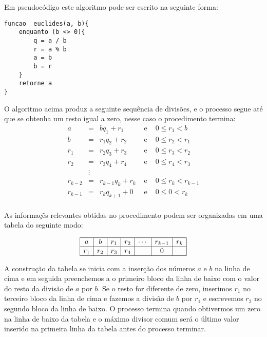 Em pseudoc\'odigo este algoritmo pode ser escrito na seguinte forma:

\begin{verbatim}
funcao  euclides(a, b){
    enquanto (b <> 0){
        q = a / b 
        r = a % b
        a = b 
        b = r
    }
    retorne a
}
\end{verbatim} 

O algoritmo acima produz a seguinte sequ\^{e}ncia de divis\~{o}es, e o processo segue at\'{e}
que se obtenha um resto igual a zero, nesse caso o procedimento termina:
\[
\begin{array}{rclcl}
a   		& =      & bq_{1}+r_{1} 			    & \textrm{ e } & 0\leq r_{1}<b       \\
b   		& =      & r_{1}q_{2}+r_{2} 	    & \textrm{ e } & 0\leq r_{2}<r_{1}       \\
r_{1}		& =      & r_{2}q_{3}+r_{3} 	    & \textrm{ e } & 0\leq r_{3}<r_{2}       \\
r_{2}   & =      & r_{3}q_{4}+r_{4} 	    & \textrm{ e } & 0\leq r_{4}<r_{3}       \\
        & \vdots &     		          	    &              &                     \\
r_{k-2} & =      & r_{k-1}q_{k}+r_{k}     & \textrm{ e } & 0\leq r_{k}<r_{k-1} \\				
r_{k-1} & =      & r_{k}q_{k+1}+ 0        & \textrm{ e } & 0\leq 0    <r_{k} \\		
\end{array}
\]  

As informa\c{c}\~{e}s relevantes obtidas no procedimento podem ser organizadas em uma tabela do seguinte modo:

\[
\begin{array}{|c|c|c|c|c|c|c|}\hline
	a     & b     & r_{1} & r_{2} & \cdots & r_{k-1} & r_{k}\\ \hline
	r_{1}	& r_{2} & r_{3} & r_{4} &        & 0       &  \\ \hline
\end{array}
\]

A constru\c{c}\~{a}o da tabela se inicia com a inser\c{c}\~{a}o dos n\'{u}meros $a$ e $b$ na linha de cima e em seguida preenchemos
a o primeiro bloco da linha de baixo com o valor do resto da divis\~{a}o de $a$ por $b$. Se o resto for diferente de zero, 
inserimos $r_{1}$ no terceiro bloco da linha de cima e fazemos a divis\~{a}o de $b$ por $r_{1}$ e escrevemos
$r_{2}$ no segundo bloco da linha de baixo.
O processo termina quando obtivermos um zero na linha de baixo da tabela e o m\'{a}ximo divisor comum ser\'{a} o 
\'{u}ltimo valor inserido na primeira linha da tabela antes do processo terminar. 

